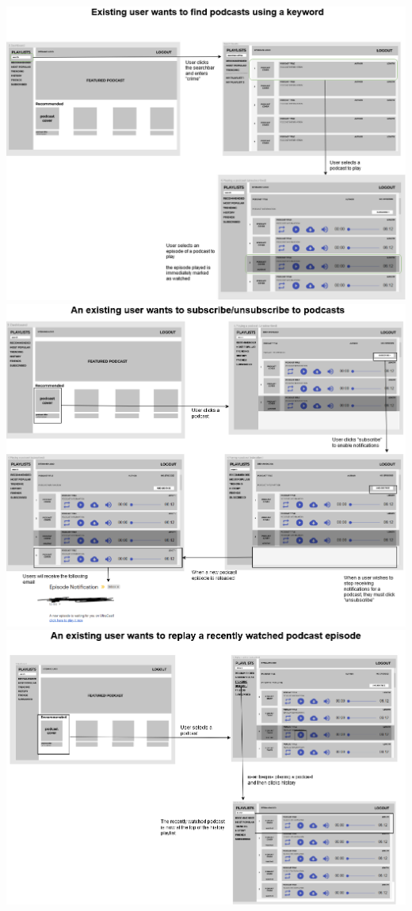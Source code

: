\documentclass[12pt]{article}
\begin{document}
\begin{appendices}
\begin{center}
    \includegraphics[width=\textwidth]{resources/search}
    \includegraphics[width=\textwidth]{resources/subscribe}
    \includegraphics[width=\textwidth]{resources/history}

\end{center}
\end{appendices}
\end{document}
